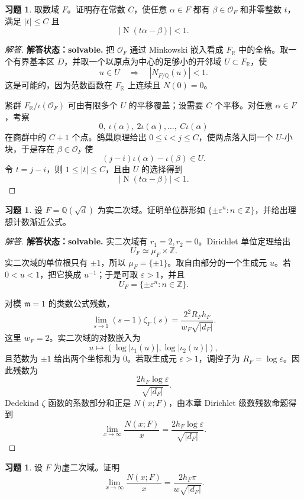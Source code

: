 \documentclass[11pt,a4paper,openany]{ctexbook}
\numberwithin{equation}{chapter}
\newcommand{\Q}{\mathbb{Q}}
\newcommand{\R}{\mathbb{R}}
\newcommand{\Z}{\mathbb{Z}}
\newcommand{\OF}{\mathcal{O}_F}
\newcommand{\Nm}{\operatorname{N}}
\theoremstyle{plain}
\theoremstyle{definition}
\newtheorem{exercise}[theorem]{习题}
\theoremstyle{remark}
\begin{document}
\begin{exercise}
取数域 $F$。证明存在常数 $C$，使任意 $\alpha\in F$ 都有 $\beta\in\OF$ 和非零整数 $t$，满足 $|t|\le C$ 且
\[
|\Nm(t\alpha-\beta)|<1.
\]
\end{exercise}

\begin{proof}[解答]
\textbf{解答状态：solvable.}
把 $\OF$ 通过 Minkowski 嵌入看成 $F_\R$ 中的全格。取一个有界基本区
$D$，并取一个以原点为中心的足够小的开邻域 $U\subset F_\R$，使
\[
u\in U\quad\Longrightarrow\quad |N_{F/\Q}(u)|<1.
\]
这是可能的，因为范数函数在 $F_\R$ 上连续且 $N(0)=0$。

紧群 $F_\R/\iota(\OF)$ 可由有限多个 $U$ 的平移覆盖；设需要 $C$ 个平移。对任意
\(\alpha\in F\)，考察
\[
0,\ \iota(\alpha),\ 2\iota(\alpha),\dots,\ C\iota(\alpha)
\]
在商群中的 $C+1$ 个点。鸽巢原理给出 $0\le i<j\le C$，使两点落入同一个
$U$-小块，于是存在 $\beta\in\OF$ 使
\[
(j-i)\iota(\alpha)-\iota(\beta)\in U.
\]
令 $t=j-i$，则 $1\le |t|\le C$，且由 $U$ 的选择得到
\[
|\Nm(t\alpha-\beta)|<1.
\]
\end{proof}

\begin{exercise}
设 $F=\Q(\sqrt d)$ 为实二次域。证明单位群形如 $\{\pm\varepsilon^n:n\in\Z\}$，并给出理想计数渐近公式。
\end{exercise}

\begin{proof}[解答]
\textbf{解答状态：solvable.}
实二次域有 $r_1=2,r_2=0$。Dirichlet 单位定理给出
\[
U_F\simeq \mu_F\times\Z.
\]
实二次域的单位根只有 $\pm1$，所以 $\mu_F=\{\pm1\}$。取自由部分的一个生成元
$u$。若 $0<u<1$，把它换成 $u^{-1}$；于是可取 $\varepsilon>1$，并且
\[
U_F=\{\pm\varepsilon^n:n\in\Z\}.
\]

对模 $\mathfrak m=1$ 的类数公式残数，
\[
\lim_{s\to1}(s-1)\zeta_F(s)
=\frac{2^{2}R_Fh_F}{w_F\sqrt{|d_F|}}.
\]
这里 $w_F=2$。实二次域的对数嵌入为
\[
u\mapsto(\log|\iota_1(u)|,\log|\iota_2(u)|),
\]
且范数为 $\pm1$ 给出两个坐标和为 $0$。若取生成元 $\varepsilon>1$，调控子为
$R_F=\log\varepsilon$。因此残数为
\[
\frac{2h_F\log\varepsilon}{\sqrt{|d_F|}}.
\]
Dedekind $\zeta$ 函数的系数部分和正是 $N(x;F)$，由本章 Dirichlet 级数残数命题得到
\[
\lim_{x\to\infty}\frac{N(x;F)}x
=\frac{2h_F\log\varepsilon}{\sqrt{|d_F|}}.
\]
\end{proof}

\begin{exercise}
设 $F$ 为虚二次域。证明
\[
\lim_{x\to\infty}\frac{N(x;F)}x
=\frac{2h_F\pi}{w\sqrt{|d_F|}}.
\]
\end{exercise}
\end{document}
